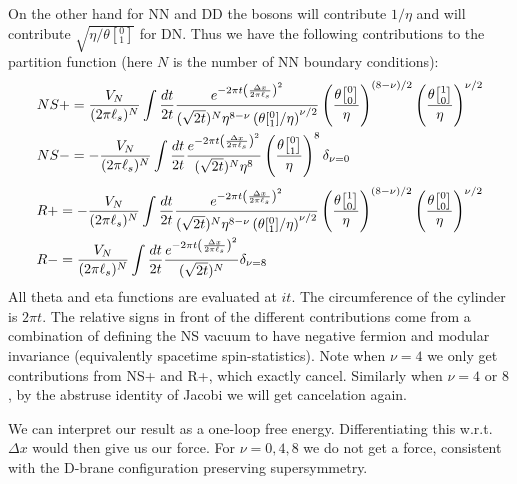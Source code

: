 \documentclass[11pt, class=article, crop=false]{standalone}
\begin{document}
\begin{enumerate}
	On the other hand for NN and DD the bosons will contribute $1/\eta$ and will contribute $\sqrt{\eta/\theta[{^0_1}]}$ for DN. Thus we have the following contributions to the partition function (here $N$ is the number of NN boundary conditions):
	\[
		\begin{aligned}
		NS+ &= \frac{V_N}{(2 \pi \ell_s)^{N}} \int \frac{dt}{2t} \frac{e^{-2 \pi t \left(\frac{\Delta x}{2 \pi \ell_s} \right)^2}}{(\sqrt{2 t})^{N} \eta^{8-\nu} \left(\theta[{^0_1}]/\eta\right)^{\nu/2}} \left(\frac{\theta\twist00}{\eta} \right)^{(8-\nu)/2} \left(\frac{\theta\twist10}{\eta} \right)^{\nu/2} 
		\\
		NS- &= -\frac{V_N}{(2 \pi \ell_s)^{N}} \int \frac{dt}{2t} \frac{e^{-2 \pi t \left(\frac{\Delta x}{2 \pi \ell_s} \right)^2}}{(\sqrt{2 t})^{N} \eta^{8}} 
		\left(\frac{\theta\twist01}{\eta} \right)^{8} \delta_{\nu=0}
		\end{aligned}
		\]
	\[
	\begin{aligned}
	R+ &= -\frac{V_N}{(2 \pi \ell_s)^{N}} \int \frac{dt}{2t} \frac{e^{-2 \pi t \left(\frac{\Delta x}{2 \pi \ell_s} \right)^2}}{(\sqrt{2 t})^{N} \eta^{8-\nu} \left(\theta[{^0_1}]/\eta\right)^{\nu/2}} 
	\left(\frac{\theta\twist10}{\eta} \right)^{(8-\nu)/2} \left(\frac{\theta\twist00}{\eta} \right)^{\nu/2} 
	\\
	R- &= \frac{V_N}{(2 \pi \ell_s)^{N}} \int \frac{dt}{2t} \frac{e^{-2 \pi t \left(\frac{\Delta x}{2 \pi \ell_s} \right)^2}}{(\sqrt{2 t})^{N} } \delta_{\nu=8} 	
	\end{aligned}
	\]
	All theta and eta functions are evaluated at $it$. The circumference of the cylinder is $2 \pi t$. The relative signs in front of the different contributions come from a combination of defining the NS vacuum to have negative fermion and modular invariance (equivalently spacetime spin-statistics). 
%
	Note when $\nu = 4$ we only get contributions from NS+ and R+, which exactly cancel. Similarly when $\nu = 4$ or $8$, by the abstruse identity of Jacobi we will get cancelation again. 
	
	We can interpret our result as a one-loop free energy. Differentiating this w.r.t. $\Delta x$ would then give us our force. For $\nu = 0, 4, 8$ we do not get a force, consistent with the D-brane configuration preserving supersymmetry. 
	

\end{enumerate}
\end{document}
